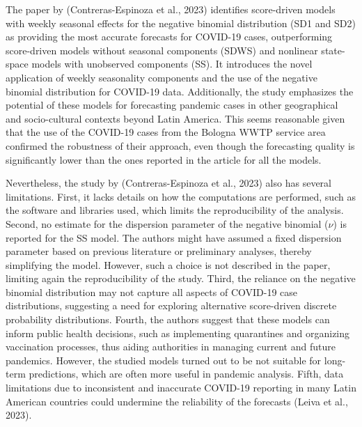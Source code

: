The paper by (Contreras-Espinoza et al., 2023) identifies score-driven models with weekly seasonal effects for the negative binomial distribution (SD1 and SD2) as providing the most accurate forecasts for COVID-19 cases, outperforming score-driven models without seasonal components (SDWS) and nonlinear state-space models with unobserved components (SS). It introduces the novel application of weekly seasonality components and the use of the negative binomial distribution for COVID-19 data. Additionally, the study emphasizes the potential of these models for forecasting pandemic cases in other geographical and socio-cultural contexts beyond Latin America. This seems reasonable given that the use of the COVID-19 cases from the Bologna WWTP service area confirmed the robustness of their approach, even though the forecasting quality is significantly lower than the ones reported in the article for all the models. \\
\vspace{1cm}

Nevertheless, the study by (Contreras-Espinoza et al., 2023) also has several limitations. First, it lacks details on how the computations are performed, such as the software and libraries used, which limits the reproducibility of the analysis. Second, no estimate for the dispersion parameter of the negative binomial ($\nu$) is reported for the SS model. The authors might have assumed a fixed dispersion parameter based on previous literature or preliminary analyses, thereby simplifying the model. However, such a choice is not described in the paper, limiting again the reproducibility of the study. Third, the reliance on the negative binomial distribution may not capture all aspects of COVID-19 case distributions, suggesting a need for exploring alternative score-driven discrete probability distributions. Fourth, the authors suggest that these models can inform public health decisions, such as implementing quarantines and organizing vaccination processes, thus aiding authorities in managing current and future pandemics. However, the studied models turned out to be not suitable for long-term predictions, which are often more useful in pandemic analysis. Fifth, data limitations due to inconsistent and inaccurate COVID-19 reporting in many Latin American countries could undermine the reliability of the forecasts (Leiva et al., 2023). 
